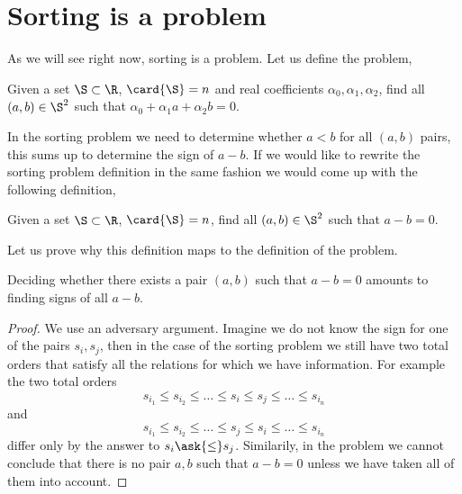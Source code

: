 \section{Sorting is a \twoLDT problem}

As we will see right now, sorting is a \twoLDT problem. Let us define the
\twoLDT problem,

\begin{problem}
Given a set $\S \subset \R$, $\card{\S} = n$ and real coefficients $\alpha_0,
\alpha_1, \alpha_2$, find all $(a,b) \in \S^2$ such that
$\alpha_0 + \alpha_1 a + \alpha_2 b = 0$.
\end{problem}

In the sorting problem we need to determine whether $a < b$ for all $(a,b)$
pairs, this sums up to determine the sign of $a-b$. If we would like to rewrite
the sorting problem definition in the same fashion we would come up with the
following definition,

\begin{problem}
Given a set $\S \subset \R$, $\card{\S} = n$, find all $(a,b) \in \S^2$ such that
$a - b = 0$.
\end{problem}

Let us prove why this definition maps to the definition of the \twoLDT
problem.

\begin{theorem}
Deciding whether there exists a pair \((a,b)\) such that \(a - b = 0\)
amounts to finding signs of all \(a-b\).
\end{theorem}

\begin{proof}
We use an adversary argument. Imagine we do not know the sign for one of the
pairs \(s_i,s_j\), then in the case of the sorting problem we still have two
total orders that satisfy all the relations for which we have information. For
example the two total orders
\begin{displaymath}
s_{i_1} \le s_{i_2} \le \ldots \le s_i \le s_j \le \ldots \le s_{i_n}
\end{displaymath}
and
\begin{displaymath}
s_{i_1} \le s_{i_2} \le \ldots \le s_j \le s_i \le \ldots \le s_{i_n}
\end{displaymath}
differ only by the answer to \(s_i \ask{\le} s_j\).
Similarily, in the \twoLDT problem we cannot conclude that there is no pair
\(a,b\) such that \(a-b=0\) unless we have taken all of them into account.
\end{proof}

